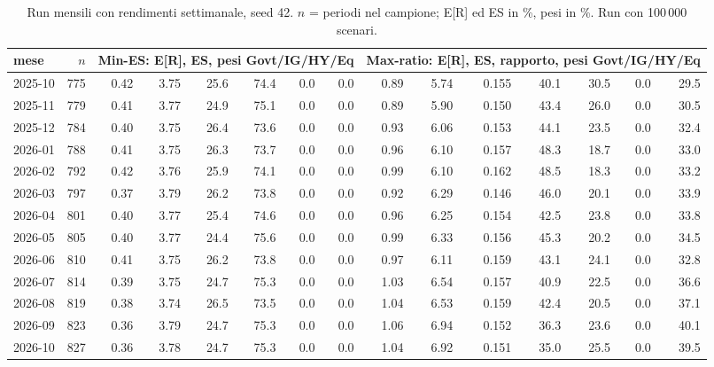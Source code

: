 \begin{table}[htbp]\centering\scriptsize\setlength{\tabcolsep}{3.5pt}
\caption{Run mensili con rendimenti settimanale, seed 42. $n$ = periodi nel campione; E[R] ed ES in \%, pesi in \%. Run con 100\,000 scenari.}\label{tab:runs_weekly}
\begin{tabular}{lrrrrrrrrrrrrrr}\toprule
mese & $n$ & \multicolumn{6}{c}{Min-ES: E[R], ES, pesi Govt/IG/HY/Eq} & \multicolumn{7}{c}{Max-ratio: E[R], ES, rapporto, pesi Govt/IG/HY/Eq} \\\midrule
2025-10 & 775 & 0.42 & 3.75 & 25.6 & 74.4 & 0.0 & 0.0 & 0.89 & 5.74 & 0.155 & 40.1 & 30.5 & 0.0 & 29.5 \\
2025-11 & 779 & 0.41 & 3.77 & 24.9 & 75.1 & 0.0 & 0.0 & 0.89 & 5.90 & 0.150 & 43.4 & 26.0 & 0.0 & 30.5 \\
2025-12 & 784 & 0.40 & 3.75 & 26.4 & 73.6 & 0.0 & 0.0 & 0.93 & 6.06 & 0.153 & 44.1 & 23.5 & 0.0 & 32.4 \\
2026-01 & 788 & 0.41 & 3.75 & 26.3 & 73.7 & 0.0 & 0.0 & 0.96 & 6.10 & 0.157 & 48.3 & 18.7 & 0.0 & 33.0 \\
2026-02 & 792 & 0.42 & 3.76 & 25.9 & 74.1 & 0.0 & 0.0 & 0.99 & 6.10 & 0.162 & 48.5 & 18.3 & 0.0 & 33.2 \\
2026-03 & 797 & 0.37 & 3.79 & 26.2 & 73.8 & 0.0 & 0.0 & 0.92 & 6.29 & 0.146 & 46.0 & 20.1 & 0.0 & 33.9 \\
2026-04 & 801 & 0.40 & 3.77 & 25.4 & 74.6 & 0.0 & 0.0 & 0.96 & 6.25 & 0.154 & 42.5 & 23.8 & 0.0 & 33.8 \\
2026-05 & 805 & 0.40 & 3.77 & 24.4 & 75.6 & 0.0 & 0.0 & 0.99 & 6.33 & 0.156 & 45.3 & 20.2 & 0.0 & 34.5 \\
2026-06 & 810 & 0.41 & 3.75 & 26.2 & 73.8 & 0.0 & 0.0 & 0.97 & 6.11 & 0.159 & 43.1 & 24.1 & 0.0 & 32.8 \\
2026-07 & 814 & 0.39 & 3.75 & 24.7 & 75.3 & 0.0 & 0.0 & 1.03 & 6.54 & 0.157 & 40.9 & 22.5 & 0.0 & 36.6 \\
2026-08 & 819 & 0.38 & 3.74 & 26.5 & 73.5 & 0.0 & 0.0 & 1.04 & 6.53 & 0.159 & 42.4 & 20.5 & 0.0 & 37.1 \\
2026-09 & 823 & 0.36 & 3.79 & 24.7 & 75.3 & 0.0 & 0.0 & 1.06 & 6.94 & 0.152 & 36.3 & 23.6 & 0.0 & 40.1 \\
2026-10 & 827 & 0.36 & 3.78 & 24.7 & 75.3 & 0.0 & 0.0 & 1.04 & 6.92 & 0.151 & 35.0 & 25.5 & 0.0 & 39.5 \\
\bottomrule\end{tabular}\end{table}

